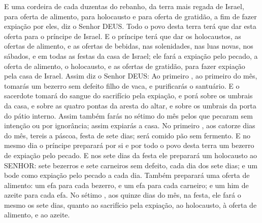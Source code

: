 {  E uma cordeira de cada duzentas do rebanho, da terra mais regada de Israel, para oferta de alimento, para holocausto e para oferta de gratidão, a fim de fazer expiação por eles, diz o Senhor DEUS.
  Todo o povo desta terra terá que dar esta oferta para o príncipe de Israel.
  E o príncipe terá que dar os holocaustos, as ofertas de alimento, e as ofertas de bebidas, nas solenidades, nas luas novas, nos sábados, e em todas as festas da casa de Israel; ele fará a expiação pelo pecado, a oferta de alimento, o holocausto, e as ofertas de gratidão, para fazer expiação pela casa de Israel.
  Assim diz o Senhor DEUS: Ao primeiro
{},  ao primeiro
{} do mês, tomarás um bezerro sem defeito filho de vaca, e purificarás o santuário.
  E o sacerdote tomará do sangue do sacrifício pela expiação, e porá
{} sobre os umbrais da casa, e sobre as quatro pontas da aresta do altar, e sobre os umbrais da porta do pátio interno.
  Assim também farás no sétimo
{} do mês pelos que pecaram sem intenção ou por ignorância; assim expiarás a casa.
  No primeiro
{},  aos catorze dias do mês, tereis a páscoa, festa de sete dias; será comido pão sem fermento.
  E no mesmo dia o príncipe preparará por si e por todo o povo desta terra um bezerro de expiação pelo pecado.
  E nos sete dias da festa ele preparará um holocausto ao SENHOR: sete bezerros e sete carneiros sem defeito, cada dia dos sete dias; e um bode como expiação pelo pecado a cada dia.
  Também preparará uma oferta de alimento: um efa para cada bezerro, e um efa para cada carneiro; e um him de azeite para cada efa.
  No sétimo
{},  aos quinze dias do mês, na festa, ele fará o mesmo
{} os sete dias, quanto ao sacrifício pela expiação, ao holocausto, à oferta de alimento, e ao azeite.
\par }

